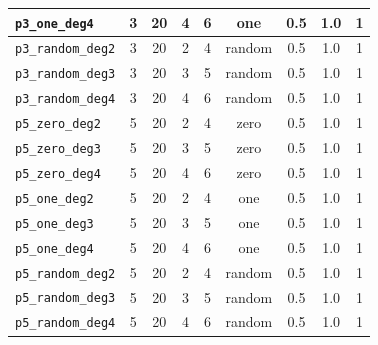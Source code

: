 \begin{table}[H]
{\begin{tabular}{lcccccccc}
\hline
\texttt{p3\_one\_deg4} & 3 & 20 & 4 & 6 & one & 0.5 & 1.0 & 1 \\
\hline
\texttt{p3\_random\_deg2} & 3 & 20 & 2 & 4 & random & 0.5 & 1.0 & 1 \\
\hline
\texttt{p3\_random\_deg3} & 3 & 20 & 3 & 5 & random & 0.5 & 1.0 & 1 \\
\hline
\texttt{p3\_random\_deg4} & 3 & 20 & 4 & 6 & random & 0.5 & 1.0 & 1 \\
\hline
\texttt{p5\_zero\_deg2} & 5 & 20 & 2 & 4 & zero & 0.5 & 1.0 & 1 \\
\hline
\texttt{p5\_zero\_deg3} & 5 & 20 & 3 & 5 & zero & 0.5 & 1.0 & 1 \\
\hline
\texttt{p5\_zero\_deg4} & 5 & 20 & 4 & 6 & zero & 0.5 & 1.0 & 1 \\
\hline
\texttt{p5\_one\_deg2} & 5 & 20 & 2 & 4 & one & 0.5 & 1.0 & 1 \\
\hline
\texttt{p5\_one\_deg3} & 5 & 20 & 3 & 5 & one & 0.5 & 1.0 & 1 \\
\hline
\texttt{p5\_one\_deg4} & 5 & 20 & 4 & 6 & one & 0.5 & 1.0 & 1 \\
\hline
\texttt{p5\_random\_deg2} & 5 & 20 & 2 & 4 & random & 0.5 & 1.0 & 1 \\
\hline
\texttt{p5\_random\_deg3} & 5 & 20 & 3 & 5 & random & 0.5 & 1.0 & 1 \\
\hline
\texttt{p5\_random\_deg4} & 5 & 20 & 4 & 6 & random & 0.5 & 1.0 & 1 \\
\bottomrule
\end{tabular}
}%
\end{table}


